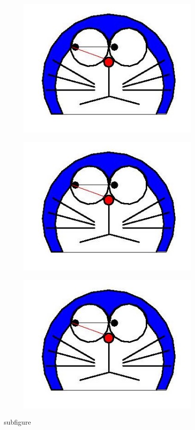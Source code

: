 \documentclass{article}
\begin{document}
\begin{figure}[htbp]
\centering
	\begin{subfigure}{.3\textwidth}%
	\centering
	\includegraphics[scale=.1]{doraemon1.jpg}
	\end{subfigure}
	\begin{subfigure}{.3\textwidth}
	\centering
	\includegraphics[scale=.3]{doraemon1.jpg}
	\end{subfigure}
	\begin{subfigure}{.3\textwidth}
	\centering
	\includegraphics[scale=.5]{doraemon1.jpg}
	\end{subfigure}	
\caption{subfigure}		
\end{figure}
\end{document}
